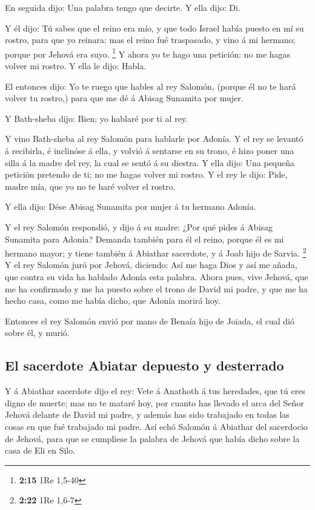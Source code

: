  En seguida dijo: Una palabra tengo que decirte. Y ella
dijo: Di.

 Y él dijo: Tú sabes que el reino era mío, y que todo
Israel había puesto en mí su rostro, para que yo reinara: mas el reino
fué traspasado, y vino á mi hermano; porque por Jehová era suyo.
\footnote{\textbf{2:15} 1Re 1,5-40}  Y ahora yo te hago una
petición: no me hagas volver mi rostro. Y ella le dijo: Habla.

 El entonces dijo: Yo te ruego que hables al rey Salomón,
(porque él no te hará volver tu rostro,) para que me dé á Abisag
Sunamita por mujer.

 Y Bath-sheba dijo: Bien; yo hablaré por ti al rey.

 Y vino Bath-sheba al rey Salomón para hablarle por Adonía.
Y el rey se levantó á recibirla, é inclinóse á ella, y volvió á sentarse
en su trono, é hizo poner una silla á la madre del rey, la cual se sentó
á su diestra.  Y ella dijo: Una pequeña petición pretendo
de ti; no me hagas volver mi rostro. Y el rey le dijo: Pide, madre mía,
que yo no te haré volver el rostro.

 Y ella dijo: Dése Abisag Sunamita por mujer á tu hermano
Adonía.

 Y el rey Salomón respondió, y dijo á su madre: ¿Por qué
pides á Abisag Sunamita para Adonía? Demanda también para él el reino,
porque él es mi hermano mayor; y tiene también á Abiathar sacerdote, y á
Joab hijo de Sarvia. \footnote{\textbf{2:22} 1Re 1,6-7}  Y
el rey Salomón juró por Jehová, diciendo: Así me haga Dios y así me
añada, que contra su vida ha hablado Adonía esta palabra. 
Ahora pues, vive Jehová, que me ha confirmado y me ha puesto sobre el
trono de David mi padre, y que me ha hecho casa, como me había dicho,
que Adonía morirá hoy.

 Entonces el rey Salomón envió por mano de Benaía hijo de
Joiada, el cual dió sobre él, y murió.

\hypertarget{el-sacerdote-abiatar-depuesto-y-desterrado}{%
\subsection{El sacerdote Abiatar depuesto y
desterrado}\label{el-sacerdote-abiatar-depuesto-y-desterrado}}

 Y á Abiathar sacerdote dijo el rey: Vete á Anathoth á tus
heredades, que tú eres digno de muerte; mas no te mataré hoy, por cuanto
has llevado el arca del Señor Jehová delante de David mi padre, y además
has sido trabajado en todas las cosas en que fué trabajado mi padre.
 Así echó Salomón á Abiathar del sacerdocio de Jehová, para
que se cumpliese la palabra de Jehová que había dicho sobre la casa de
Eli en Silo.

